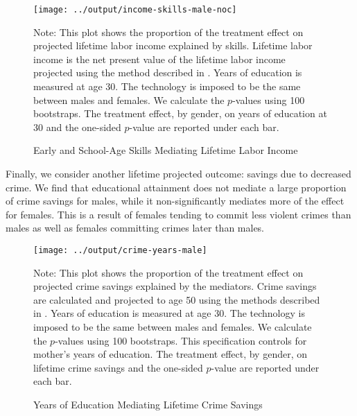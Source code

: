 \begin{figure}[H]
\begin{center}
\caption{Early and School-Age Skills Mediating Lifetime Labor Income}
\label{fig:skills-incomenpv}
	\texttt{[image: ../output/income-skills-male-noc]}
\end{center}
\raggedright
Note: This plot shows the proportion of the treatment effect on projected lifetime labor income explained by skills. Lifetime labor income is the net present value of the lifetime labor income projected using the method described in \citet{Garcia_etal_2016_Comp_CBA_Unpublished}. Years of education is measured at age 30. The technology is imposed to be the same between males and females. We calculate the $p$-values using 100 bootstraps. The treatment effect, by gender, on years of education at 30 and the one-sided $p$-value are reported under each bar.
\end{figure}

Finally, we consider another lifetime projected outcome: savings due to decreased crime. We find that educational attainment does not mediate a large proportion of crime savings for males, while it non-significantly mediates more of the effect for females. This is a result of females tending to commit less violent crimes than males as well as females committing crimes later than males.

\begin{figure}[H]
\begin{center}
\caption{Years of Education Mediating Lifetime Crime Savings}
\label{fig:years-crime}
	\texttt{[image: ../output/crime-years-male]}
\end{center}
\raggedright
Note: This plot shows the proportion of the treatment effect on projected crime savings explained by the mediators. Crime savings are calculated and projected to age 50 using the methods described in \citet{Garcia_etal_2016_Comp_CBA_Unpublished}. Years of education is measured at age 30. The technology is imposed to be the same between males and females. We calculate the $p$-values using 100 bootstraps. This specification controls for mother's years of education. The treatment effect, by gender, on lifetime crime savings and the one-sided $p$-value are reported under each bar.
\end{figure}

